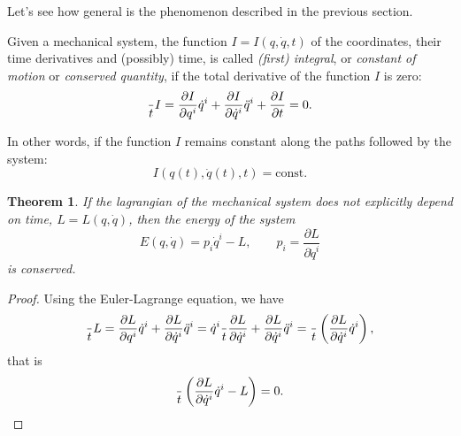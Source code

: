 \documentclass[english,fontsize=11pt,paper=a5,oneside]{scrbook}
\let\d\relax
\DeclareMathOperator{\d}{d}
\newtheorem{theorem}{Theorem}[chapter]
\theoremstyle{definition}
\begin{document}
Let's see how general is the phenomenon described in the previous section.

\begin{tcolorbox}
    Given a mechanical system, the function $I = I(q, \dot q, t)$ of the coordinates, their time derivatives and (possibly) time, is called \emph{(first) integral}, or \emph{constant of motion} or \emph{conserved quantity}, if the total derivative of the function $I$ is zero:
    \begin{equation}\label{eq:firstintegralD}
        \frac{\d}{\d t}I =
            \frac{\partial I}{\partial q^i} \dot q^i + 
            \frac{\partial I}{\partial \dot q^i} \ddot q^i +
            \frac{\partial I}{\partial t}
            = 0.
    \end{equation}
\end{tcolorbox}

In other words, if the function $I$ remains constant along the paths followed by the system:
\begin{equation}
    I(q(t),\dot q(t), t) = \mathrm{const}.
\end{equation}

\begin{theorem}\label{thm:conservationEnergy}
If the lagrangian of the mechanical system does not explicitly depend on time, $L = L(q, \dot q)$, then the \emph{energy} of the system
\begin{equation}\label{eq:energy1}
    E(q,\dot q) = p_i \dot q^i - L,\qquad p_i = \frac{\partial L}{\partial \dot q^i}
\end{equation}
is conserved.
\end{theorem}
\begin{proof}
    Using the Euler-Lagrange equation, we have
    \begin{equation}
        \frac{\d}{\d t} L
        = \frac{\partial L}{\partial q^i} \dot q^i + \frac{\partial L}{\partial \dot q^i} \ddot q^i
        = \dot q^i \frac{\d}{\d t} \frac{\partial L}{\partial \dot q^i} + \frac{\partial L}{\partial \dot q^i} \ddot q^i
        = \frac{\d}{\d t}\left(\frac{\partial L}{\partial \dot q^i} \dot q^i\right),
    \end{equation}
    that is
    \begin{equation}
        \frac{\d}{\d t}\left(\frac{\partial L}{\partial \dot q^i} \dot q^i - L\right) = 0.
    \end{equation}
\end{proof}
\end{document}
